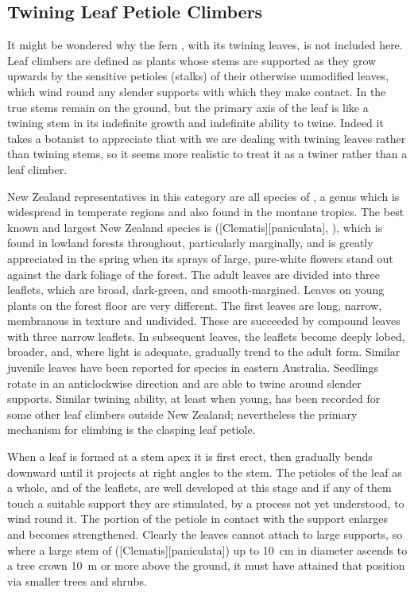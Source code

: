 \subsection{Twining Leaf Petiole Climbers}

It might be wondered why the fern , with its twining leaves, is not included here.
Leaf climbers are defined as plants whose stems are supported as they grow upwards by the sensitive petioles (stalks) of their otherwise unmodified leaves, which wind round any slender supports with which they make contact.
In  the true stems remain on the ground, but the primary axis of the leaf is like a twining stem in its indefinite growth and indefinite ability to twine.
Indeed it takes a botanist to appreciate that with  we are dealing with twining leaves rather than twining stems, so it seems more realistic to treat it as a twiner rather than a leaf climber.

New Zealand representatives in this category are all species of , a genus which is widespread in temperate regions and also found in the montane tropics.
The best known and largest New Zealand species is  ([Clematis][paniculata], ), which is found in lowland forests throughout, particularly marginally, and is greatly appreciated in the spring when its sprays of large, pure-white flowers stand out against the dark foliage of the forest.
The adult leaves are divided into three leaflets, which are broad, dark-green, and smooth-margined.
Leaves on young plants on the forest floor are very different.
The first leaves are long, narrow, membranous in texture and undivided.
These are succeeded by compound leaves with three narrow leaflets.
In subsequent leaves, the leaflets become deeply lobed, broader, and, where light is adequate, gradually trend to the adult form.
Similar juvenile leaves have been reported for  species in eastern Australia.
Seedlings rotate in an anticlockwise direction and are able to twine around slender supports.
Similar twining ability, at least when young, has been recorded for some other leaf climbers outside New Zealand; nevertheless the primary mechanism for climbing is the clasping leaf petiole.

When a leaf is formed at a stem apex it is first erect, then gradually bends downward until it projects at right angles to the stem.
The petioles of the leaf as a whole, and of the leaflets, are well developed at this stage and if any of them touch a suitable support they are stimulated, by a process not yet understood, to wind round it.
The portion of the petiole in contact with the support enlarges and becomes strengthened.
Clearly the leaves cannot attach to large supports, so where a large stem of  ([Clematis][paniculata]) up to \SI{10}{\centi\metre} in diameter ascends to a tree crown \SI{10}{\metre} or more above the ground, it must have attained that position via smaller trees and shrubs.

